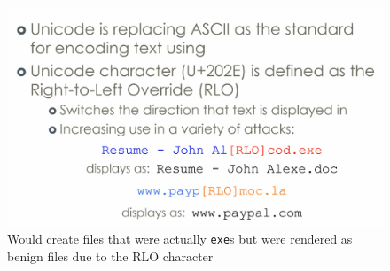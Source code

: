 \documentclass[../notes.tex]{subfiles}
\begin{document}
\begin{figure}[H]
    \centering
    \includegraphics[width=0.8\linewidth]{img/image_2023-04-03-19-37-39.png}
    \caption{Would create files that were actually \texttt{exe}s but were rendered as benign files due to the RLO character}
\end{figure}

\end{document}
